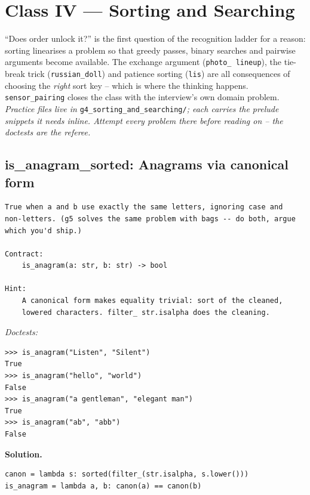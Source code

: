 \documentclass[11pt,letterpaper]{book}
\begin{document}
\chapter{Class IV --- Sorting and Searching}

``Does order unlock it?'' is the first question of the recognition ladder for a
reason: sorting linearises a problem so that greedy passes, binary searches and
pairwise arguments become available. The exchange argument (\texttt{photo\_%
lineup}), the tie-break trick (\texttt{russian\_doll}) and patience sorting
(\texttt{lis}) are all consequences of choosing the \emph{right} sort key --
which is where the thinking happens. \texttt{sensor\_pairing} closes the class
with the interview's own domain problem.
\medskip\noindent\textit{Practice files live in }\texttt{g4\_sorting\_and\_searching/}\textit{;
each carries the prelude snippets it needs inline. Attempt every problem there
before reading on -- the doctests are the referee.}

\section{is\_anagram\_sorted: Anagrams via canonical form}
\begin{lstlisting}[style=spec]
True when a and b use exactly the same letters, ignoring case and
non-letters. (g5 solves the same problem with bags -- do both, argue
which you'd ship.)

Contract:
    is_anagram(a: str, b: str) -> bool

Hint:
    A canonical form makes equality trivial: sort of the cleaned,
    lowered characters. filter_ str.isalpha does the cleaning.
\end{lstlisting}
\noindent\textit{Doctests:}
\begin{lstlisting}[style=spec]
>>> is_anagram("Listen", "Silent")
True
>>> is_anagram("hello", "world")
False
>>> is_anagram("a gentleman", "elegant man")
True
>>> is_anagram("ab", "abb")
False
\end{lstlisting}
\noindent\textbf{Solution.}
\begin{lstlisting}[style=code]
canon = lambda s: sorted(filter_(str.isalpha, s.lower()))
is_anagram = lambda a, b: canon(a) == canon(b)
\end{lstlisting}
\end{document}
